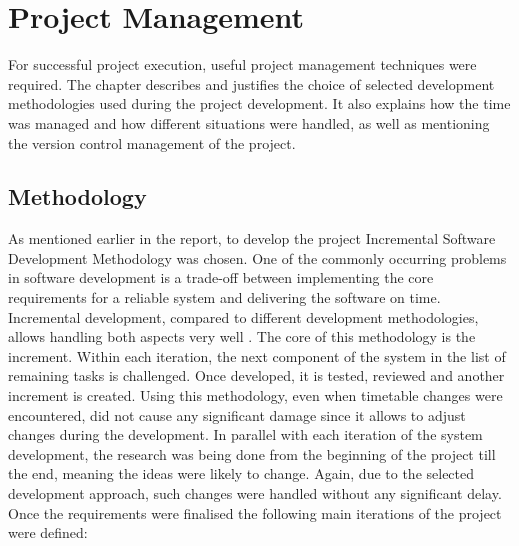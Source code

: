 \documentclass[10pt]{report}
\begin{document}



\chapter{Project Management}

For successful project execution, useful project management techniques were required. The chapter describes and justifies the choice of selected development methodologies used during the project development. It also explains how the time was managed and how different situations were handled, as well as mentioning the version control management of the project.

\section{Methodology} \label{methodology}

As mentioned earlier in the report, to develop the project Incremental Software Development Methodology was chosen. One of the commonly occurring problems in software development is a trade-off between implementing the core requirements for a reliable system and delivering the software on time. Incremental development, compared to different development methodologies, allows handling both aspects very well \cite{incremental}. The core of this methodology is the increment. Within each iteration, the next component of the system in the list of remaining tasks is challenged. Once developed, it is tested, reviewed and another increment is created. Using this methodology, even when timetable changes were encountered, did not cause any significant damage since it allows to adjust changes during the development. In parallel with each iteration of the system development, the research was being done from the beginning of the project till the end, meaning the ideas were likely to change. Again, due to the selected development approach, such changes were handled without any significant delay. Once the requirements were finalised the following main iterations of the project were defined:
\end{document}
